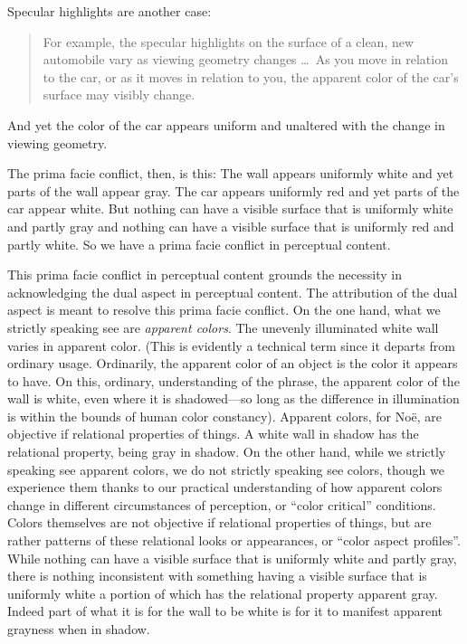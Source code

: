 \documentclass[12pt]{article}
\begin{document}
Specular highlights are another case:
	\begin{quote}
		For example, the specular highlights on the surface of a clean, new automobile vary as viewing geometry changes \ldots\ As you move in relation to the car, or as it moves in relation to you, the apparent color of the car's surface may visibly change. \citep[125]{Noe:2004fk}
	\end{quote}
And yet the color of the car appears uniform and unaltered with the change in viewing geometry.

The prima facie conflict, then, is this: The wall appears uniformly white and yet parts of the wall appear gray. The car appears uniformly red and yet parts of the car appear white. But nothing can have a visible surface that is uniformly white and partly gray and nothing can have a visible surface that is uniformly red and partly white. So we have a prima facie conflict in perceptual content.

This prima facie conflict in perceptual content grounds the necessity in acknowledging the dual aspect in perceptual content. The attribution of the dual aspect is meant to resolve this prima facie conflict. On the one hand, what we strictly speaking see are \emph{apparent colors}. The unevenly illuminated white wall varies in apparent color. (This is evidently a technical term since it departs from ordinary usage. Ordinarily, the apparent color of an object is the color it appears to have. On this, ordinary, understanding of the phrase, the apparent color of the wall is white, even where it is shadowed---so long as the difference in illumination is within the bounds of human color constancy). Apparent colors, for Noë, are objective if relational properties of things. A white wall in shadow has the relational property, being gray in shadow. On the other hand, while we strictly speaking see apparent colors, we do not strictly speaking see colors, though we experience them thanks to our practical understanding of how apparent colors change in different circumstances of perception, or ``color critical'' conditions. Colors themselves are not objective if relational properties of things, but are rather patterns of these relational looks or appearances, or ``color aspect profiles''. While nothing can have a visible surface that is uniformly white and partly gray, there is nothing inconsistent with something having a visible surface that is uniformly white a portion of which has the relational property apparent gray. Indeed part of what it is for the wall to be white is for it to manifest apparent grayness when in shadow.
\end{document}
